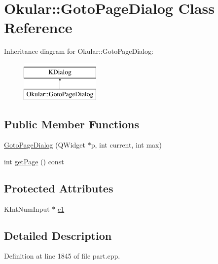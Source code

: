 \hypertarget{classOkular_1_1GotoPageDialog}{\section{Okular\+:\+:Goto\+Page\+Dialog Class Reference}
\label{classOkular_1_1GotoPageDialog}
}
Inheritance diagram for Okular\+:\+:Goto\+Page\+Dialog\+:\begin{figure}[H]
\begin{center}
\leavevmode
\includegraphics[height=2.000000cm]{classOkular_1_1GotoPageDialog}
\end{center}
\end{figure}
\subsection*{Public Member Functions}
\begin{DoxyCompactItemize}
\item 
\hyperlink{classOkular_1_1GotoPageDialog_ad3cf3773a31b49f8215c7fe4a0c026ab}{Goto\+Page\+Dialog} (Q\+Widget $\ast$p, int current, int max)
\item 
int \hyperlink{classOkular_1_1GotoPageDialog_afe9ea4eec443190d1223e7fd996e7549}{get\+Page} () const 
\end{DoxyCompactItemize}
\subsection*{Protected Attributes}
\begin{DoxyCompactItemize}
\item 
K\+Int\+Num\+Input $\ast$ \hyperlink{classOkular_1_1GotoPageDialog_ab4919058fdc361280d33c19245013029}{e1}
\end{DoxyCompactItemize}


\subsection{Detailed Description}


Definition at line 1845 of file part.\+cpp.



